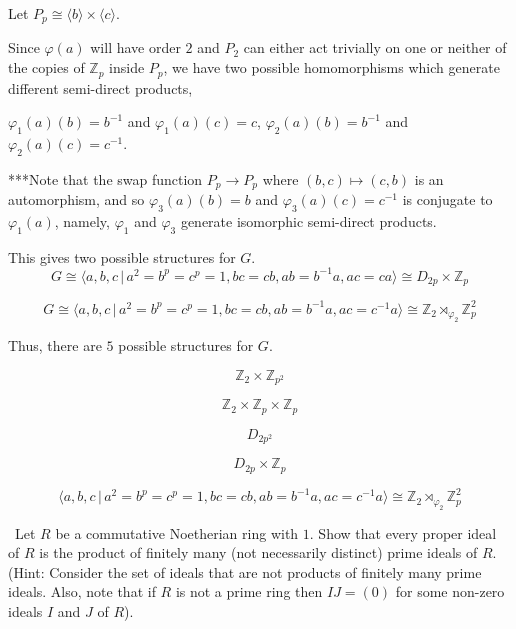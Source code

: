 \documentclass[12pt]{Qual}
\begin{document}
\begin{solution}
Let $P_p\cong\langle b\rangle\times\langle c\rangle.$

Since $\varphi(a)$ will have order $2$ and $P_2$ can either act trivially on one or neither of the copies of $\mathbb{Z}_p$ inside $P_p$, we have two possible homomorphisms which generate different semi-direct products,

$\varphi_1(a)(b)=b^{-1}$ and $\varphi_1(a)(c)=c$, $\varphi_2(a)(b)=b^{-1}$ and $\varphi_2(a)(c)=c^{-1}$.

\begin{mybox}
***Note that the swap function $P_p\to P_p$ where $(b,c)\mapsto (c,b)$ is an automorphism, and so $\varphi_3(a)(b)=b$ and $\varphi_3(a)(c)=c^{-1}$ is conjugate to $\varphi_1(a)$, namely, $\varphi_1$ and $\varphi_3$ generate isomorphic semi-direct products.
\end{mybox}

This gives two possible structures for $G$. $$G\cong\langle a,b,c\,|\,a^2=b^p=c^p=1,bc=cb,ab=b^{-1}a,ac=ca\rangle\cong D_{2p}\times\mathbb{Z}_p$$

$$G\cong\langle a,b,c\,|\,a^2=b^p=c^p=1,bc=cb,ab=b^{-1}a,ac=c^{-1}a\rangle\cong \mathbb{Z}_2\rtimes_{\varphi_2}\mathbb{Z}_p^2$$

Thus, there are $5$ possible structures for $G.$

\begin{center}
    \begin{framed}
    $$\mathbb{Z}_2\times\mathbb{Z}_{p^2}$$

    $$\mathbb{Z}_2\times\mathbb{Z}_p\times\mathbb{Z}_p$$

    $$D_{2p^2}$$

    $$D_{2p}\times\mathbb{Z}_p$$

    $$\langle a,b,c\,|\,a^2=b^p=c^p=1,bc=cb,ab=b^{-1}a,ac=c^{-1}a\rangle\cong \mathbb{Z}_2\rtimes_{\varphi_2}\mathbb{Z}_p^2$$
    \end{framed}
\end{center}
\end{solution}
\newpage


\begin{problem} $\,$
Let $R$ be a commutative Noetherian ring with $1$. Show that every proper ideal of $R$ is the product of finitely many (not necessarily distinct) prime ideals of $R$. (Hint: Consider the set of ideals that are not products of finitely many prime ideals. Also, note that if $R$ is not a prime ring then $IJ=(0)$ for some non-zero ideals $I$ and $J$ of $R$).
\end{problem}
\end{document}
